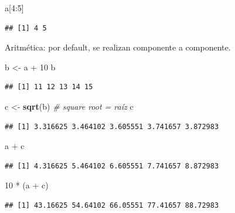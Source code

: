 \documentclass[]{article}
\newenvironment{Shaded}{\begin{snugshade}}{\end{snugshade}}
\newcommand{\KeywordTok}[1]{\textcolor[rgb]{0.13,0.29,0.53}{\textbf{{#1}}}}
\newcommand{\DecValTok}[1]{\textcolor[rgb]{0.00,0.00,0.81}{{#1}}}
\newcommand{\StringTok}[1]{\textcolor[rgb]{0.31,0.60,0.02}{{#1}}}
\newcommand{\CommentTok}[1]{\textcolor[rgb]{0.56,0.35,0.01}{\textit{{#1}}}}
\newcommand{\NormalTok}[1]{{#1}}
\begin{document}
\begin{Shaded}
\begin{Highlighting}[]
\NormalTok{a[}\DecValTok{4}\NormalTok{:}\DecValTok{5}\NormalTok{]}
\end{Highlighting}
\end{Shaded}

\begin{verbatim}
## [1] 4 5
\end{verbatim}

Aritmética: por default, se realizan componente a componente.

\begin{Shaded}
\begin{Highlighting}[]
\NormalTok{b <-}\StringTok{ }\NormalTok{a +}\StringTok{ }\DecValTok{10}
\NormalTok{b}
\end{Highlighting}
\end{Shaded}

\begin{verbatim}
## [1] 11 12 13 14 15
\end{verbatim}

\begin{Shaded}
\begin{Highlighting}[]
\NormalTok{c <-}\StringTok{ }\KeywordTok{sqrt}\NormalTok{(b) }\CommentTok{# square root = raíz}
\NormalTok{c}
\end{Highlighting}
\end{Shaded}

\begin{verbatim}
## [1] 3.316625 3.464102 3.605551 3.741657 3.872983
\end{verbatim}

\begin{Shaded}
\begin{Highlighting}[]
\NormalTok{a +}\StringTok{ }\NormalTok{c}
\end{Highlighting}
\end{Shaded}

\begin{verbatim}
## [1] 4.316625 5.464102 6.605551 7.741657 8.872983
\end{verbatim}

\begin{Shaded}
\begin{Highlighting}[]
\DecValTok{10} \NormalTok{*}\StringTok{ }\NormalTok{(a +}\StringTok{ }\NormalTok{c)}
\end{Highlighting}
\end{Shaded}

\begin{verbatim}
## [1] 43.16625 54.64102 66.05551 77.41657 88.72983
\end{verbatim}
\end{document}
